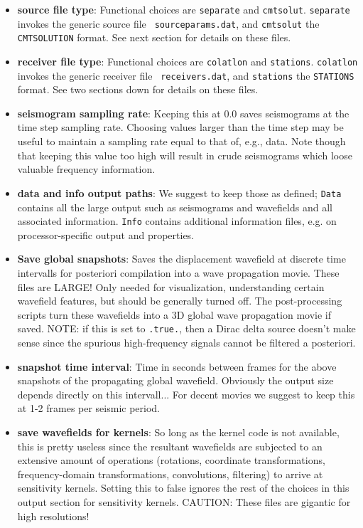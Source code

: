 \documentclass[11pt,letter,fleqn,english,notitlepage]{article}
\begin{document}
\begin{itemize}
    \item \textbf{source file type}: Functional choices are {\tt separate} and
    {\tt cmtsolut}.  {\tt separate} invokes the generic source file {\tt
    sourceparams.dat}, and {\tt cmtsolut} the {\tt CMTSOLUTION} format. See
    next section for details on these files. 

    \item \textbf{receiver file type}: Functional choices are {\tt colatlon}
    and {\tt stations}.  {\tt colatlon} invokes the generic receiver file {\tt
    receivers.dat}, and {\tt stations} the {\tt STATIONS} format. See two
    sections down for details on these files. 

    \item \textbf{seismogram sampling rate}: Keeping this at 0.0 saves
    seismograms at the time step sampling rate. Choosing values larger than the
    time step may be useful to maintain a sampling rate equal to that of, e.g.,
    data. Note though that keeping this value too high will result in crude
    seismograms which loose valuable frequency information.
    
    \item \textbf{data and info output paths}: We suggest to keep those as
    defined; {\tt Data} contains all the large output such as seismograms and
    wavefields and all associated information. {\tt Info} contains additional
    information files, e.g. on processor-specific output and properties. 
    
    \item \textbf{Save global snapshots}: Saves the displacement wavefield at
    discrete time intervalls for posteriori compilation into a wave propagation
    movie. These files are LARGE!  Only needed for visualization, understanding
    certain wavefield features, but should be generally turned off. The
    post-processing scripts turn these wavefields into a 3D global wave
    propagation movie if saved. NOTE: if this is set to {\tt .true.}, then a
    Dirac delta source doesn't make sense since the spurious high-frequency
    signals cannot be filtered a posteriori. 
    
    \item \textbf{snapshot time interval}: Time in seconds between frames for
    the above snapshots of the propagating global wavefield. Obviously the
    output size depends directly on this intervall...  For decent movies we
    suggest to keep this at 1-2 frames per seismic period.  

    \item \textbf{save wavefields for kernels}: So long as the kernel code is
    not available, this is pretty useless since the resultant wavefields are
    subjected to an extensive amount of operations (rotations, coordinate
    transformations, frequency-domain transformations, convolutions, filtering)
    to arrive at sensitivity kernels. Setting this to false ignores the rest of
    the choices in this output section for sensitivity kernels. CAUTION: These
    files are gigantic for high resolutions!
    

\end{itemize}
\end{document}
